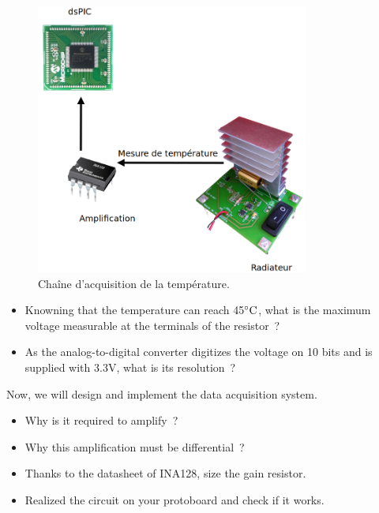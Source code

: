\documentclass[11pt,a4paper]{article}
\theoremstyle{definition}%
\begin{document}
\begin{figure}[H]
\center
\includegraphics[width=0.8\textwidth]{acquisition}
\caption{Chaîne d'acquisition de la température.}
\label{fig:acquisition}
\end{figure}

\begin{itemize}
	\item Knowning that the temperature can reach 45$\celsius$, what is the maximum voltage measurable at the terminals of the resistor~?
	\item As the analog-to-digital converter digitizes the voltage on 10 bits and is supplied with 3.3V, what is its resolution~?
\end{itemize}

Now, we will design and implement the data acquisition system.
\begin{itemize}
	\item Why is it required to amplify~?
	\item Why this amplification must be differential~?
	\item Thanks to the datasheet of INA128, size the gain resistor.
	\item Realized the circuit on your protoboard and check if it works.
\end{itemize}
\end{document}

